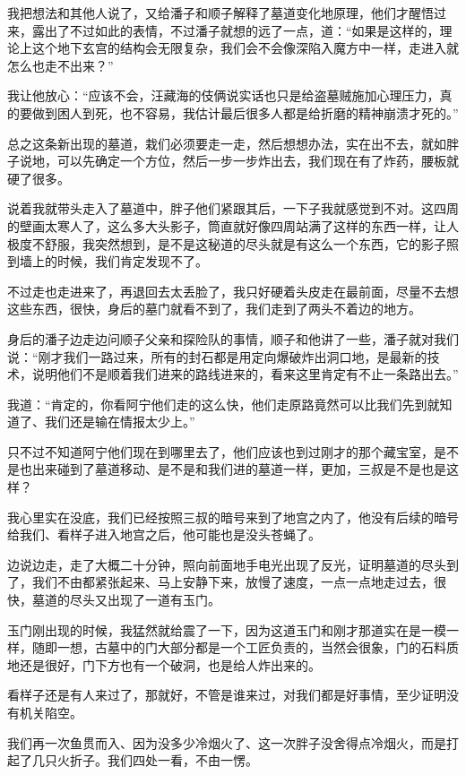 我把想法和其他人说了，又给潘子和顺子解释了墓道变化地原理，他们才醒悟过来，露出了不过如此的表情，不过潘子就想的远了一点，道：“如果是这样的，理论上这个地下玄宫的结构会无限复杂，我们会不会像深陷入魔方中一样，走进入就怎么也走不出来？”

我让他放心：“应该不会，汪藏海的伎俩说实话也只是给盗墓贼施加心理压力，真的要做到困人到死，也不容易，我估计最后很多人都是给折磨的精神崩溃才死的。”

总之这条新出现的墓道，栽们必须要走一走，然后想想办法，实在出不去，就如胖子说地，可以先确定一个方位，然后一步一步炸出去，我们现在有了炸药，腰板就硬了很多。

说着我就带头走入了墓道中，胖子他们紧跟其后，一下子我就感觉到不对。这四周的壁画太寒人了，这么多大头影子，筒直就好像四周站满了这样的东西一样，让人极度不舒服，我突然想到，是不是这秘道的尽头就是有这么一个东西，它的影子照到墙上的时候，我们肯定发现不了。

不过走也走进来了，再退回去太丢脸了，我只好硬着头皮走在最前面，尽量不去想这些东西，很快，身后的墓门就看不到了，我们走到了两头不着边的地方。

身后的潘子边走边问顺子父亲和探险队的事情，顺子和他讲了一些，潘子就对我们说：“刚才我们一路过来，所有的封石都是用定向爆破炸出洞口地，是最新的技术，说明他们不是顺着我们进来的路线进来的，看来这里肯定有不止一条路出去。”

我道：“肯定的，你看阿宁他们走的这么快，他们走原路竟然可以比我们先到就知道了、我们还是输在情报太少上。”

只不过不知道阿宁他们现在到哪里去了，他们应该也到过刚才的那个藏宝室，是不是也出来碰到了墓道移动、是不是和我们进的墓道一样，更加，三叔是不是也是这样？

我心里实在没底，我们已经按照三叔的暗号来到了地宫之内了，他没有后续的暗号给我们、看样子进入地宫之后，他可能也是没头苍蝇了。

边说边走，走了大概二十分钟，照向前面地手电光出现了反光，证明墓道的尽头到了，我们不由都紧张起来、马上安静下来，放慢了速度，一点一点地走过去，很快，墓道的尽头又出现了一道有玉门。

玉门刚出现的时候，我猛然就给震了一下，因为这道玉门和刚才那道实在是一模一样，随即一想，古墓中的门大部分都是一个工匠负责的，当然会很象，门的石料质地还是很好，门下方也有一个破洞，也是给人炸出来的。

看样子还是有人来过了，那就好，不管是谁来过，对我们都是好事情，至少证明没有机关陷空。

我们再一次鱼贯而入、因为没多少冷烟火了、这一次胖子没舍得点冷烟火，而是打起了几只火折子。我们四处一看，不由一愣。

